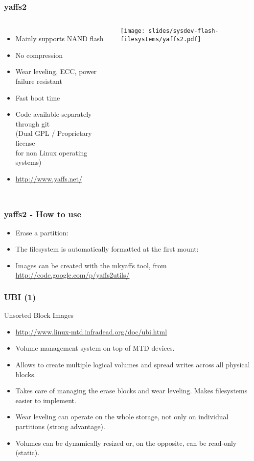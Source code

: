 \begin{frame}
  \frametitle{yaffs2}
  \begin{columns}
    \begin{itemize}
    \item Mainly supports NAND flash
    \item No compression
    \item Wear leveling, ECC, power failure resistant
    \item Fast boot time
    \item Code available separately through git\\
      (Dual GPL / Proprietary license\\
      for non Linux operating systems)
    \item \url{http://www.yaffs.net/}
    \end{itemize}
    \texttt{[image: slides/sysdev-flash-filesystems/yaffs2.pdf]}
  \end{columns}
\end{frame}

\begin{frame}
  \frametitle{yaffs2 - How to use}
  \begin{itemize}
  \item Erase a partition:\\
  \item The filesystem is automatically formatted at the first mount:\\
  \item Images can be created with the mkyaffs tool, from \\
    \url{http://code.google.com/p/yaffs2utils/}
  \end{itemize}
\end{frame}

\begin{frame}
  \frametitle{UBI (1)}
  Unsorted Block Images
  \begin{itemize}
  \item \url{http://www.linux-mtd.infradead.org/doc/ubi.html}
  \item Volume management system on top of MTD devices.
  \item Allows to create multiple logical volumes and spread writes
    across all physical blocks.
  \item Takes care of managing the erase blocks and wear
    leveling. Makes filesystems easier to implement.
  \item Wear leveling can operate on the whole storage,
    not only on individual partitions (strong advantage). 
  \item Volumes can be dynamically resized or, on the opposite, can be
    read-only (static).
  \end{itemize}
\end{frame}


